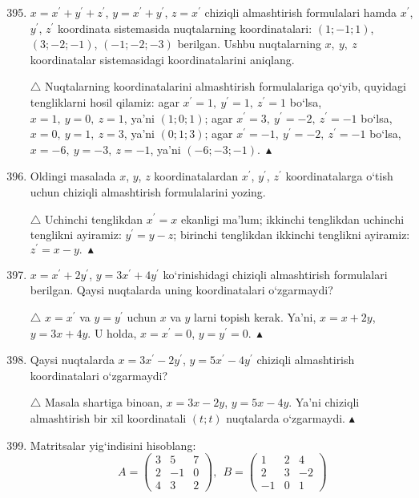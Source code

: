 \begin{enumerate}\setcounter{enumi}{394}
	
	\item $x=x^\prime+y^\prime+z^\prime$, $y=x^\prime+y^\prime$, $z=x^\prime$ chiziqli almashtirish formulalari hamda $x^\prime$, $y^\prime$, $z^\prime$ koordinata sistemasida nuqtalarning koordinatalari: $(1;-1;1)$, $(3;-2;-1)$, $(-1;-2;-3)$ berilgan. Ushbu nuqtalarning $x,\ y,\ z$ koordinatalar sistemasidagi koordinatalarini aniqlang.
	
	$\triangle$ Nuqtalarning koordinatalarini almashtirish formulalariga qo`yib, quyidagi tengliklarni hosil qilamiz: agar $x^\prime=1,\ y^\prime=1,\ z^\prime=1$ bo`lsa, $x=1,\ y=0,\ z=1$, ya'ni $(1;0;1)$; agar $x^\prime=3,\ y^\prime=-2,\ z^\prime=-1$ bo`lsa, $x=0,\ y=1,\ z=3$, ya'ni $(0;1;3)$; agar $x^\prime=-1,\ y^\prime=-2,\ z^\prime=-1$ bo`lsa, $x=-6,\ y=-3,\ z=-1$, ya'ni $(-6;-3;-1).\ \blacktriangle$
	
	\item Oldingi masalada $x$, $y$, $z$ koordinatalardan $x^\prime$, $y^\prime$, $z^\prime$ koordinatalarga o`tish uchun chiziqli almashtirish formulalarini yozing.
	
	$\triangle$ Uchinchi tenglikdan $x^\prime=x$ ekanligi ma'lum; ikkinchi tenglikdan uchinchi tenglikni ayiramiz: $y^\prime=y-z$; birinchi tenglikdan ikkinchi tenglikni ayiramiz: $z^\prime=x-y.\ \blacktriangle$ 
	
	\item $x=x^\prime+2y^\prime$, $y=3x^\prime+4y^\prime$ ko`rinishidagi chiziqli almashtirish formulalari berilgan. Qaysi nuqtalarda uning koordinatalari o`zgarmaydi?
	
	$\triangle$ $x=x^\prime$ va $y=y^\prime$ uchun $x$ va $y$ larni topish kerak. Ya'ni, $x=x+2y$, $y=3x+4y$. U holda, $x=x^\prime=0$, $y=y^\prime=0.\ \blacktriangle$
	
	\item Qaysi nuqtalarda $x=3x^\prime-2y^\prime$, $y=5x^\prime-4y^\prime$ chiziqli almashtirish koordinatalari o`zgarmaydi?
	
	$\triangle$ Masala shartiga binoan, $x=3x-2y$, $y=5x-4y$. Ya'ni chiziqli almashtirish bir xil koordinatali  $(t;t)$ nuqtalarda o`zgarmaydi. $\blacktriangle$
	
	\item Matritsalar yig`indisini hisoblang:
	$$A=\begin{pmatrix}
		3&5&7\\
		2&-1&0\\
		4&3&2
	\end{pmatrix},\ \ B=\begin{pmatrix}
	1&2&4\\
	2&3&-2\\
	-1&0&1
\end{pmatrix}$$


\end{enumerate}
